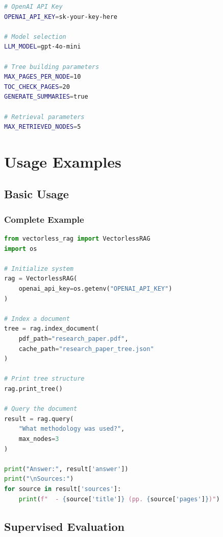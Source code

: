 \begin{lstlisting}[language=bash, caption=.env File]
# OpenAI API Key
OPENAI_API_KEY=sk-your-key-here

# Model selection
LLM_MODEL=gpt-4o-mini

# Tree building parameters
MAX_PAGES_PER_NODE=10
TOC_CHECK_PAGES=20
GENERATE_SUMMARIES=true

# Retrieval parameters
MAX_RETRIEVED_NODES=5
\end{lstlisting}

\section{Usage Examples}

\subsection{Basic Usage}

\subsubsection{Complete Example}

\begin{lstlisting}[language=Python, caption=Basic Usage Example]
from vectorless_rag import VectorlessRAG
import os

# Initialize system
rag = VectorlessRAG(
    openai_api_key=os.getenv("OPENAI_API_KEY")
)

# Index a document
tree = rag.index_document(
    pdf_path="research_paper.pdf",
    cache_path="research_paper_tree.json"
)

# Print tree structure
rag.print_tree()

# Query the document
result = rag.query(
    "What methodology was used?",
    max_nodes=3
)

print("Answer:", result['answer'])
print("\nSources:")
for source in result['sources']:
    print(f"  - {source['title']} (pp. {source['pages']})")
\end{lstlisting}

\subsection{Supervised Evaluation}

